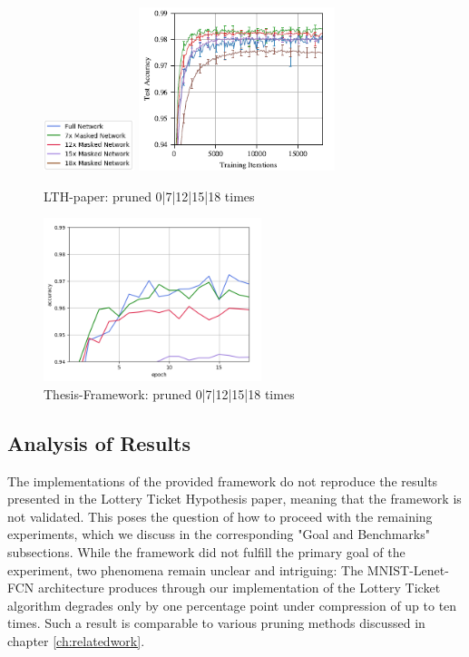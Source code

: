 \begin{figure}
	\begin{minipage}{\textwidth}
		\centering
		\includegraphics[width=100px]{gfx/7-Evaluation/LTH_2_legend.png}
	\end{minipage}
	\begin{minipage}{0.5\textwidth}
		\centering
		\includegraphics[height=180px]{gfx/7-Evaluation/LTH_2.png}
		\caption*{LTH-paper: pruned 0|7|12|15|18 times}
		\label{?}
	\end{minipage}\hfill
	\begin{minipage}{0.5\textwidth}
		\centering
		\includegraphics[height=180px]{gfx/Experiments/Reproduction-MNIST-FCN/accuracy/LTH_2.png}
		\caption*{Thesis-Framework: pruned 0|7|12|15|18 times}
		\label{?}
	\end{minipage}
\end{figure}
\subsection*{Analysis of Results}
The implementations of the provided framework do not reproduce the results presented in the Lottery Ticket Hypothesis paper, meaning that the framework is not validated. This poses the question of how to proceed with the remaining experiments, which we discuss in the corresponding "Goal and Benchmarks" subsections.
While the framework did not fulfill the primary goal of the experiment, two phenomena remain unclear and intriguing:
The MNIST-Lenet-FCN architecture produces through our implementation of the Lottery Ticket algorithm degrades only by one percentage point under compression of up to ten times. Such a result is comparable to various pruning methods discussed in chapter \ref{ch:relatedwork}. 

